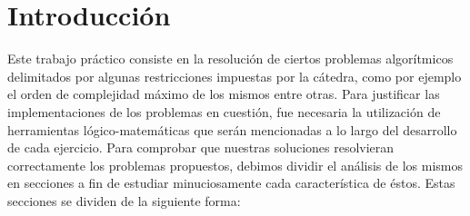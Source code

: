 \documentclass[10pt, a4paper]{article}
\author{Algoritmos y Estructuras de Datos III, DC, UBA.}
\date{}
\title{}
\begin{document}
	
\thispagestyle{empty}
\titulo{}

\maketitle

\tableofcontents
\newpage

\section{Introducci\'on}
Este trabajo práctico consiste en la resolución de ciertos problemas algorítmicos delimitados por algunas restricciones impuestas por la cátedra, como por ejemplo el orden de complejidad máximo de los mismos entre otras. Para justificar las implementaciones de los problemas en cuestión, fue necesaria la utilización de herramientas lógico-matemáticas que serán mencionadas a lo largo del desarrollo de cada ejercicio.\newline
Para comprobar que nuestras soluciones resolvieran correctamente los problemas propuestos, debimos dividir el análisis de los mismos en secciones a fin de estudiar minuciosamente cada característica de éstos. Estas secciones se dividen de la siguiente forma:\newline
\end{document}
